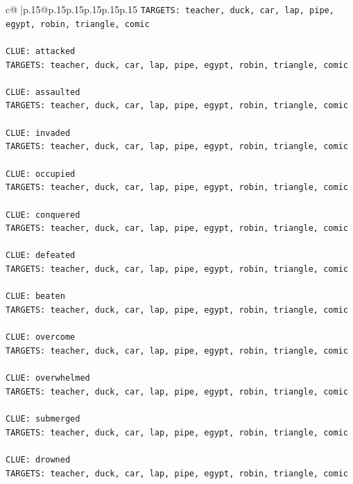 \documentclass{article}
\begin{document}
{\begin{supertabular}{c@{$\;$}|p{.15\linewidth}@{}p{.15\linewidth}p{.15\linewidth}p{.15\linewidth}p{.15\linewidth}p{.15\linewidth}}
{{{\texttt{TARGETS: teacher, duck, car, lap, pipe, egypt, robin, triangle, comic} \\
\\ 
\texttt{CLUE: attacked} \\
\texttt{TARGETS: teacher, duck, car, lap, pipe, egypt, robin, triangle, comic} \\
\\ 
\texttt{CLUE: assaulted} \\
\texttt{TARGETS: teacher, duck, car, lap, pipe, egypt, robin, triangle, comic} \\
\\ 
\texttt{CLUE: invaded} \\
\texttt{TARGETS: teacher, duck, car, lap, pipe, egypt, robin, triangle, comic} \\
\\ 
\texttt{CLUE: occupied} \\
\texttt{TARGETS: teacher, duck, car, lap, pipe, egypt, robin, triangle, comic} \\
\\ 
\texttt{CLUE: conquered} \\
\texttt{TARGETS: teacher, duck, car, lap, pipe, egypt, robin, triangle, comic} \\
\\ 
\texttt{CLUE: defeated} \\
\texttt{TARGETS: teacher, duck, car, lap, pipe, egypt, robin, triangle, comic} \\
\\ 
\texttt{CLUE: beaten} \\
\texttt{TARGETS: teacher, duck, car, lap, pipe, egypt, robin, triangle, comic} \\
\\ 
\texttt{CLUE: overcome} \\
\texttt{TARGETS: teacher, duck, car, lap, pipe, egypt, robin, triangle, comic} \\
\\ 
\texttt{CLUE: overwhelmed} \\
\texttt{TARGETS: teacher, duck, car, lap, pipe, egypt, robin, triangle, comic} \\
\\ 
\texttt{CLUE: submerged} \\
\texttt{TARGETS: teacher, duck, car, lap, pipe, egypt, robin, triangle, comic} \\
\\ 
\texttt{CLUE: drowned} \\
\texttt{TARGETS: teacher, duck, car, lap, pipe, egypt, robin, triangle, comic} \\
}}}
\end{supertabular}}
\end{document}
